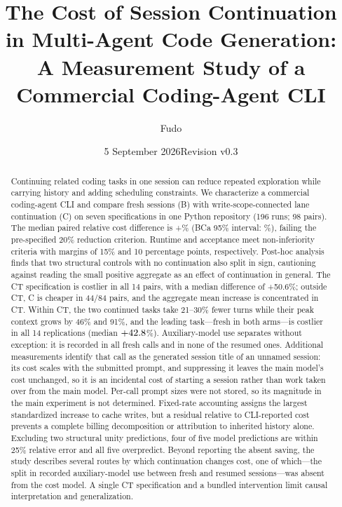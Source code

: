 \documentclass[a4paper,11pt]{article}
\title{\sffamily The Cost of Session Continuation in Multi-Agent Code Generation:\\
A Measurement Study of a Commercial Coding-Agent CLI}
\author{Fudo}
\date{5 September 2026\quad Revision v0.3}
\begin{document}
\maketitle
\begin{abstract}
Continuing related coding tasks in one session can reduce repeated exploration while carrying history and adding scheduling constraints. We characterize a commercial coding-agent CLI and compare fresh sessions (B) with write-scope-connected lane continuation (C) on seven specifications in one Python repository (196 runs; 98 pairs). The median paired relative cost difference is +\CostMedian\% (BCa 95\% interval: \CostCI\%), failing the pre-specified 20\% reduction criterion. Runtime and acceptance meet non-inferiority criteria with margins of 15\% and 10 percentage points, respectively. Post-hoc analysis finds that two structural controls with no continuation also split in sign, cautioning against reading the small positive aggregate as an effect of continuation in general. The CT specification is costlier in all 14 pairs, with a median difference of +50.6\%; outside CT, C is cheaper in 44/84 pairs, and the aggregate mean increase is concentrated in CT. Within CT, the two continued tasks take 21--30\% fewer turns while their peak context grows by 46\% and 91\%, and the leading task---fresh in both arms---is costlier in all 14 replications (median $+42.8$\%). Auxiliary-model use separates without exception: it is recorded in all \AuxFresh{} fresh calls and in none of the \AuxResumed{} resumed ones. Additional measurements identify that call as the generated session title of an unnamed session: its cost scales with the submitted prompt, and suppressing it leaves the main model's cost unchanged, so it is an incidental cost of starting a session rather than work taken over from the main model. Per-call prompt sizes were not stored, so its magnitude in the main experiment is not determined. Fixed-rate accounting assigns the largest standardized increase to cache writes, but a residual relative to CLI-reported cost prevents a complete billing decomposition or attribution to inherited history alone. Excluding two structural unity predictions, four of five model predictions are within 25\% relative error and all five overpredict. Beyond reporting the absent saving, the study describes several routes by which continuation changes cost, one of which---the split in recorded auxiliary-model use between fresh and resumed sessions---was absent from the cost model. A single CT specification and a bundled intervention limit causal interpretation and generalization.
\end{abstract}
\end{document}
